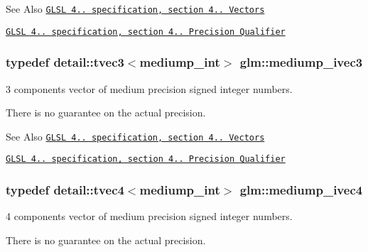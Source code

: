 \begin{DoxySeeAlso}{See Also}
\href{http://www.opengl.org/registry/doc/GLSLangSpec.4.20.8.pdf}{\tt G\-L\-S\-L 4.. specification, section 4.. Vectors} 

\href{http://www.opengl.org/registry/doc/GLSLangSpec.4.20.8.pdf}{\tt G\-L\-S\-L 4.. specification, section 4.. Precision Qualifier} 
\end{DoxySeeAlso}
\hypertarget{group__core__precision_gab824e682bc463998efbcd4a512ebf209}{
\subsubsection[{mediump\-\_\-ivec3}]{\setlength{\rightskip}{0pt plus 5cm}typedef detail\-::tvec3$<$mediump\-\_\-int$>$ {\bf glm\-::mediump\-\_\-ivec3}}}\label{group__core__precision_gab824e682bc463998efbcd4a512ebf209}


3 components vector of medium precision signed integer numbers. 

There is no guarantee on the actual precision.

\begin{DoxySeeAlso}{See Also}
\href{http://www.opengl.org/registry/doc/GLSLangSpec.4.20.8.pdf}{\tt G\-L\-S\-L 4.. specification, section 4.. Vectors} 

\href{http://www.opengl.org/registry/doc/GLSLangSpec.4.20.8.pdf}{\tt G\-L\-S\-L 4.. specification, section 4.. Precision Qualifier} 
\end{DoxySeeAlso}
\hypertarget{group__core__precision_gaabd2534479a6e7e493a7362b9f4c63cd}{
\subsubsection[{mediump\-\_\-ivec4}]{\setlength{\rightskip}{0pt plus 5cm}typedef detail\-::tvec4$<$mediump\-\_\-int$>$ {\bf glm\-::mediump\-\_\-ivec4}}}\label{group__core__precision_gaabd2534479a6e7e493a7362b9f4c63cd}


4 components vector of medium precision signed integer numbers. 

There is no guarantee on the actual precision.

